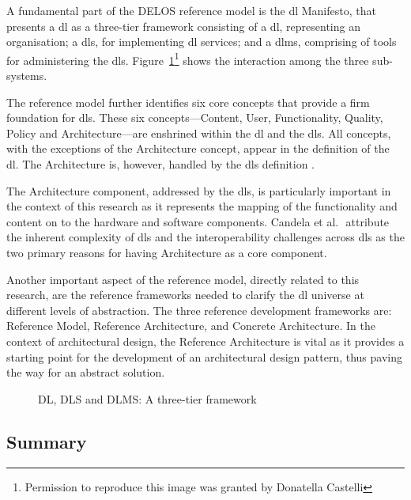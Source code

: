 A fundamental part of the DELOS reference model is the \gls{dl} Manifesto, that presents a \gls{dl} as a three-tier framework consisting of a \gls{dl}, representing an organisation; a \gls{dls}, for implementing \gls{dl} services; and a \gls{dlms}, comprising of tools for administering the \gls{dls}. Figure~\ref{fig:background:reference-models-frameworks:delos}\footnote{Permission to reproduce this image was granted by Donatella Castelli} shows the interaction among the three sub-systems.

The reference model further identifies six core concepts that provide a firm foundation for \glspl{dl}. These six concepts---Content, User, Functionality, Quality, Policy and Architecture---are enshrined within the \gls{dl} and the \gls{dls}. All concepts, with the exceptions of the Architecture concept, appear in the definition of the \gls{dl}. The Architecture is, however, handled by the \gls{dls} definition \citep{Candela2007}⁠.

The Architecture component, addressed by the \gls{dls}, is particularly important in the context of this research as it represents the mapping of the functionality and content on to the hardware and software components. Candela et al. \citep{Candela2007}⁠ attribute the inherent complexity of \glspl{dl} and the interoperability challenges across \glspl{dl} as the two primary reasons for having Architecture as a core component.

Another important aspect of the reference model, directly related to this research, are the reference frameworks needed to clarify the \gls{dl} universe at different levels of abstraction. The three reference development frameworks are: Reference Model, Reference Architecture, and Concrete Architecture. In the context of architectural design, the Reference Architecture is vital as it provides a starting point for the development of an architectural design pattern, thus paving the way for an abstract solution.

\begin{figure}
  \centering
\caption[DL, DLS and DLMS: A three-tier framework]{DL, DLS and DLMS: A three-tier framework}
\label{fig:background:reference-models-frameworks:delos}
\end{figure}

\subsection{Summary}
\label{sec:background:reference-models-frameworks:summary}

